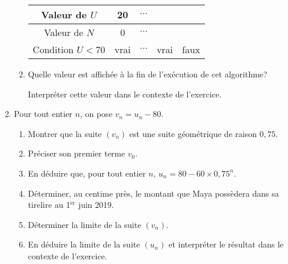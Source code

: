 \begin{enumerate}
\begin{enumerate}[label=\alph*.]
          \begin{center}
               \begin{extern}%
                    \begin{tabular}{|c|c|c|c|c|} \hline
                         Valeur de $U$ & 20 & \hspace*{1cm} $\cdots$  \hspace*{1cm}&  & \\ \hline
                         Valeur de $N$ & 0 &  $\cdots$ & & \\ \hline
                         Condition $U<70$ & vrai & $\cdots$  & vrai & faux \\ \hline
                    \end{tabular}
               \end{extern}
          \end{center}
          \item Quelle valeur est affichée à la fin de l'exécution de cet algorithme?
          \par
          Interpréter cette valeur dans le contexte de l'exercice.
     \end{enumerate}
     \item Pour tout entier $n$, on pose $v_n=u_n-80$.
     \begin{enumerate}[label=\alph*.]
          \item  Montrer que la suite $(v_n)$ est une suite géométrique de raison $0,75$.
          \item Préciser son premier terme $v_0$.
          \item En déduire que, pour tout entier $n$, $u_n=80-60\times 0,75^{n}$.
          \item Déterminer, au centime près, le montant que Maya possèdera dans sa tirelire au 1${^\text{er}}$ juin 2019.
          \item Déterminer la limite de la suite $(v_n)$.
          \item En déduire la limite de la suite $(u_n)$ et interpréter le résultat dans le contexte de l'exercice.
     \end{enumerate}
\end{enumerate}
